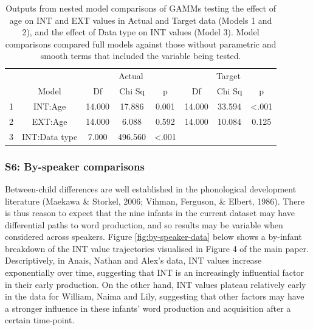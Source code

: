 \documentclass[
  man,floatsintext]{apa6}
\begin{document}
\begin{longtable}[t]{cccccccc}
\caption{\label{tab:table-GAMM-outputs}Outputs from nested model comparisons of GAMMs testing the effect of age on INT and EXT values in Actual and Target data (Models 1 and 2), and the effect of Data type on INT values (Model 3). Model comparisons compared full models against those without parametric and smooth terms that included the variable being tested.}\\
\toprule
\multicolumn{2}{c}{ } & \multicolumn{3}{c}{Actual} & \multicolumn{3}{c}{Target} \\
\cmidrule(l{3pt}r{3pt}){3-5} \cmidrule(l{3pt}r{3pt}){6-8}
  & Model & Df & Chi Sq & p & Df & Chi Sq & p\\
\midrule
1 & INT:Age & 14.000 & 17.886 & 0.001 & 14.000 & 33.594 & <.001\\
2 & EXT:Age & 14.000 & 6.088 & 0.592 & 14.000 & 10.084 & 0.125\\
3 & INT:Data type & 7.000 & 496.560 & <.001 &  &  & \\
\bottomrule
\end{longtable}

\newpage

\hypertarget{s6-by-speaker-comparisons}{%
\subsubsection{S6: By-speaker comparisons}\label{s6-by-speaker-comparisons}}

Between-child differences are well established in the phonological development literature (Maekawa \& Storkel, 2006; Vihman, Ferguson, \& Elbert, 1986). There is thus reason to expect that the nine infants in the current dataset may have differential paths to word production, and so results may be variable when considered across speakers. Figure \ref{fig:by-speaker-data} below shows a by-infant breakdown of the INT value trajectories visualised in Figure 4 of the main paper. Descriptively, in Anais, Nathan and Alex's data, INT values increase exponentially over time, suggesting that INT is an increasingly influential factor in their early production. On the other hand, INT values plateau relatively early in the data for William, Naima and Lily, suggesting that other factors may have a stronger influence in these infants' word production and acquisition after a certain time-point.
\end{document}
